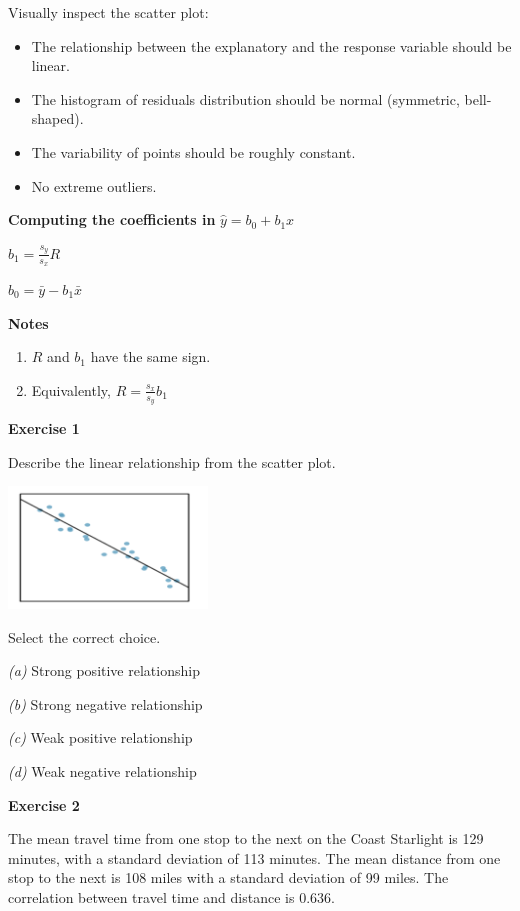 \documentclass[
]{book}
\providecommand{\tightlist}{%
  \setlength{\itemsep}{0pt}\setlength{\parskip}{0pt}}
\begin{document}
Visually inspect the scatter plot:

\begin{itemize}
\tightlist
\item
  The relationship between the explanatory and the response variable should be linear.
\item
  The histogram of residuals distribution should be normal (symmetric, bell-shaped).
\item
  The variability of points should be roughly constant.
\item
  No extreme outliers.
\end{itemize}

\textbf{Computing the coefficients in} \(\hat{y} = b_0 + b_1x\)

\(b_1 = \frac{s_y}{s_x} R\)

\(b_0 = \bar{y} - b_1 \bar{x}\)

\textbf{Notes}

\begin{enumerate}
\def\labelenumi{\arabic{enumi}.}
\item
  \(R\) and \(b_1\) have the same sign.
\item
  Equivalently, \(R = \frac{s_x}{s_y} b_1\)
\end{enumerate}

\textbf{Exercise 1}

Describe the linear relationship from the scatter plot.

\includegraphics[width=2.08333in,height=\textheight]{images/img55.png}

Select the correct choice.

\emph{(a)} Strong positive relationship

\emph{(b)} Strong negative relationship

\emph{(c)} Weak positive relationship

\emph{(d)} Weak negative relationship

\textbf{Exercise 2}

The mean travel time from one stop to the next on the Coast Starlight is 129 minutes, with a standard deviation of 113 minutes. The mean distance from one stop to the next is 108 miles with a standard deviation of 99 miles. The correlation between travel time and distance is 0.636.
\end{document}
